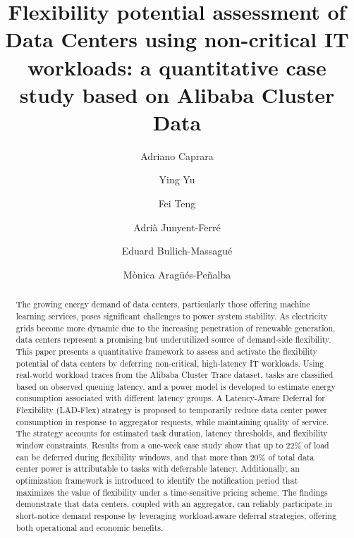 \documentclass[preprint,12pt]{elsarticle}
\begin{document}
\begin{frontmatter}

\title{Flexibility potential assessment of Data Centers using non-critical IT workloads: a quantitative case study based on Alibaba Cluster Data} %

\author[1]{Adriano Caprara}

\author[2]{Ying Yu}

\author[2]{Fei Teng}

\author[2]{Adri\`{a} Junyent-Ferr\'{e}}

\author[1]{Eduard Bullich-Massagué}

\author[1]{M\`{o}nica Arag\"{u}\'{e}s-Pe\~{n}alba}




\begin{abstract}
The growing energy demand of data centers, particularly those offering machine learning services, poses significant challenges to power system stability. As electricity grids become more dynamic due to the increasing penetration of renewable generation, data centers represent a promising but underutilized source of demand-side flexibility. This paper presents a quantitative framework to assess and activate the flexibility potential of data centers by deferring non-critical, high-latency IT workloads. Using real-world workload traces from the Alibaba Cluster Trace dataset, tasks are classified based on observed queuing latency, and a power model is developed to estimate energy consumption associated with different latency groups. A Latency-Aware Deferral for Flexibility (LAD-Flex) strategy is proposed to temporarily reduce data center power consumption in response to aggregator requests, while maintaining quality of service. The strategy accounts for estimated task duration, latency thresholds, and flexibility window constraints. Results from a one-week case study show that up to 22\% of load can be deferred during flexibility windows, and that more than 20\% of total data center power is attributable to tasks with deferrable latency. Additionally, an optimization framework is introduced to identify the notification period that maximizes the value of flexibility under a time-sensitive pricing scheme. The findings demonstrate that data centers, coupled with an aggregator, can reliably participate in short-notice demand response by leveraging workload-aware deferral strategies, offering both operational and economic benefits.
\end{abstract}


\end{frontmatter}
\end{document}
